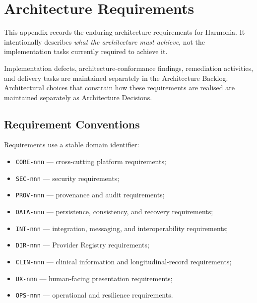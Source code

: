 
\chapter{Architecture Requirements}
\label{app:requirements}

This appendix records the enduring architecture requirements for Harmonia. It intentionally describes \emph{what the architecture must achieve}, not the implementation tasks currently required to achieve it.

Implementation defects, architecture-conformance findings, remediation activities, and delivery tasks are maintained separately in the Architecture Backlog. Architectural choices that constrain how these requirements are realised are maintained separately as Architecture Decisions.

\section{Requirement Conventions}

Requirements use a stable domain identifier:

\begin{itemize}
    \item \texttt{CORE-nnn} --- cross-cutting platform requirements;
    \item \texttt{SEC-nnn} --- security requirements;
    \item \texttt{PROV-nnn} --- provenance and audit requirements;
    \item \texttt{DATA-nnn} --- persistence, consistency, and recovery requirements;
    \item \texttt{INT-nnn} --- integration, messaging, and interoperability requirements;
    \item \texttt{DIR-nnn} --- Provider Registry requirements;
    \item \texttt{CLIN-nnn} --- clinical information and longitudinal-record requirements;
    \item \texttt{UX-nnn} --- human-facing presentation requirements;
    \item \texttt{OPS-nnn} --- operational and resilience requirements.
\end{itemize}

